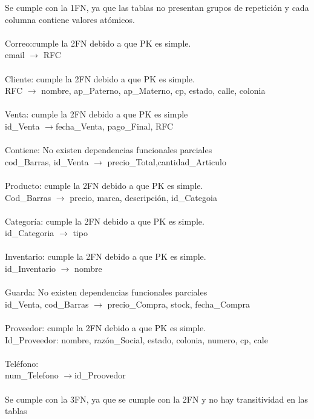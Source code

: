 \documentclass[12pt,letterpaper]{article}
\begin{document}
	Se cumple con la 1FN, ya que las tablas no presentan grupos de repetición y cada columna contiene valores atómicos.\\
	\\
	Correo:cumple la 2FN debido a que PK es simple.
	\\ email $\rightarrow$ RFC \\
	\\ Cliente: cumple la 2FN debido a que PK es simple.
	\\ RFC $\rightarrow$ {nombre, ap\_Paterno, ap\_Materno, cp, estado, calle, colonia}\\
	\\ Venta: cumple la 2FN debido a que PK es simple
	\\ id\_Venta $\rightarrow${fecha\_Venta, pago\_Final, RFC}\\
	\\ Contiene: No existen dependencias funcionales parciales
	\\ {cod\_Barras, id\_Venta} $\rightarrow$ {precio\_Total,cantidad\_Articulo}\\
	\\Producto: cumple la 2FN debido a que PK es simple.
	\\Cod\_Barras $\rightarrow$ {precio, marca, descripción, id\_Categoia}\\
	\\Categoría: cumple la 2FN debido a que PK es simple.
	\\id\_Categoria $\rightarrow$ tipo\\
	\\Inventario: cumple la 2FN debido a que PK es simple.
	\\id\_Inventario $\rightarrow$ nombre\\
	\\Guarda: No existen dependencias funcionales parciales
	\\{id\_Venta, cod\_Barras} $\rightarrow$ {precio\_Compra, stock, fecha\_Compra}\\
	\\Proveedor: cumple la 2FN debido a que PK es simple.
	\\Id\_Proveedor: nombre, razón\_Social, estado, colonia, numero, cp, cale \\
	\\Teléfono:
	\\num\_Telefono $\rightarrow$id\_Proovedor\\
	
	\\Se cumple con la 3FN, ya que se cumple con la 2FN y no hay transitividad en las tablas\\
	
\end{document}
